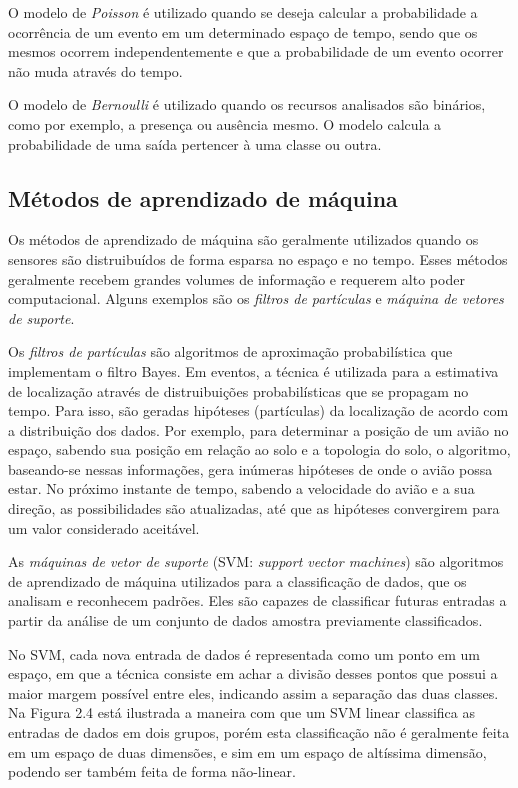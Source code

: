O modelo de \textit{Poisson} é utilizado quando se deseja calcular a probabilidade a ocorrência de um evento em um determinado espaço de tempo, sendo que os mesmos ocorrem independentemente e que a probabilidade de um evento ocorrer não muda através do tempo.

O modelo de \textit{Bernoulli} é utilizado quando os recursos analisados são binários, como por exemplo, a presença ou ausência mesmo. O modelo calcula a probabilidade de uma saída pertencer à uma classe ou outra.	

\subsection{Métodos de aprendizado de máquina}
	
Os métodos de aprendizado de máquina são geralmente utilizados quando os sensores são distruibuídos de forma esparsa no espaço e no tempo. Esses métodos geralmente recebem grandes volumes de informação e requerem alto poder computacional. Alguns exemplos são os \textit{filtros de partículas} e \textit{máquina de vetores de suporte}.

Os \textit{filtros de partículas} são algoritmos de aproximação probabilística que implementam o filtro Bayes. Em eventos, a técnica é utilizada para a estimativa de localização através de distruibuições probabilísticas que se propagam no tempo. Para isso, são geradas hipóteses (partículas) da localização de acordo com a distribuição dos dados. Por exemplo, para determinar a posição de um avião no espaço, sabendo sua posição em relação ao solo e a topologia do solo, o algoritmo, baseando-se nessas informações, gera inúmeras hipóteses de onde o avião possa estar. No próximo instante de tempo, sabendo a velocidade do avião e a sua direção, as possibilidades são atualizadas, até que as hipóteses convergirem para um valor considerado aceitável.

As \textit{máquinas de vetor de suporte} (SVM: \textit{support vector machines}) são algoritmos de aprendizado de máquina utilizados para a classificação de dados, que os analisam e reconhecem padrões. Eles são capazes de classificar futuras entradas a partir da análise de um conjunto de dados amostra previamente classificados.

No SVM, cada nova entrada de dados é representada como um ponto em um espaço, em que a técnica consiste em achar a divisão desses pontos que possui a maior margem possível entre eles, indicando assim a separação das duas classes. Na Figura 2.4 está ilustrada a maneira com que um SVM linear classifica as entradas de dados em dois grupos, porém esta classificação não é geralmente feita em um espaço de duas dimensões, e sim em um espaço de altíssima dimensão, podendo ser também feita de forma não-linear.

